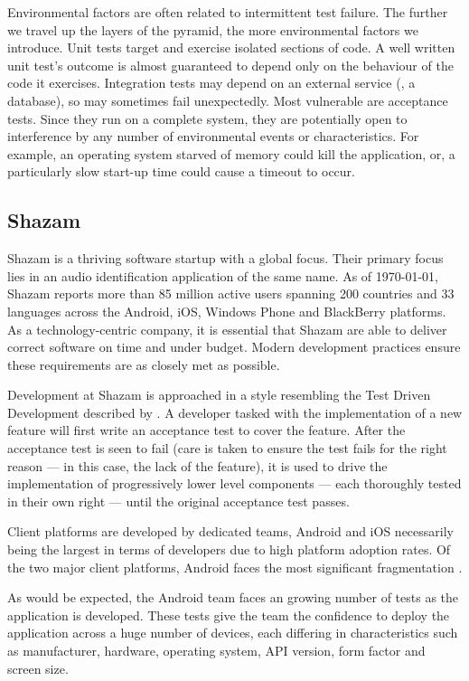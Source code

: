 Environmental factors are often related to intermittent test failure. The further we travel up the layers of the pyramid, the more environmental factors we introduce. Unit tests target and exercise isolated sections of code. A well written unit test's outcome is almost guaranteed to depend only on the behaviour of the code it exercises. Integration tests may depend on an external service (\eg, a database), so may sometimes fail unexpectedly. Most vulnerable are acceptance tests. Since they run on a complete system, they are potentially open to interference by any number of environmental events or characteristics. For example, an operating system starved of memory could kill the application, or, a particularly slow start-up time could cause a timeout to occur.


\subsection{Shazam}

Shazam is a thriving software startup with a global focus. Their primary focus lies in an audio identification application of the same name. As of \today, Shazam reports more than 85 million active users spanning 200 countries and 33 languages across the Android, iOS, Windows Phone and BlackBerry platforms. As a technology-centric company, it is essential that Shazam are able to deliver correct software on time and under budget. Modern development practices ensure these requirements are as closely met as possible.

Development at Shazam is approached in a style resembling the Test Driven Development described by \citet*{freeman2009growing}. A developer tasked with the implementation of a new feature will first write an acceptance test to cover the feature. After the acceptance test is seen to fail (care is taken to ensure the test fails for the right reason --- in this case, the lack of the feature), it is used to drive the implementation of progressively lower level components --- each thoroughly tested in their own right --- until the original acceptance test passes.

Client platforms are developed by dedicated teams, Android and iOS necessarily being the largest in terms of developers due to high platform adoption rates. Of the two major client platforms, Android faces the most significant fragmentation \cite{AndroidFragmentationVisualized}.

As would be expected, the Android team faces an growing number of tests as the application is developed.  These tests give the team the confidence to deploy the application across a huge number of devices, each differing in characteristics such as manufacturer, hardware, operating system, API version, form factor and screen size.

